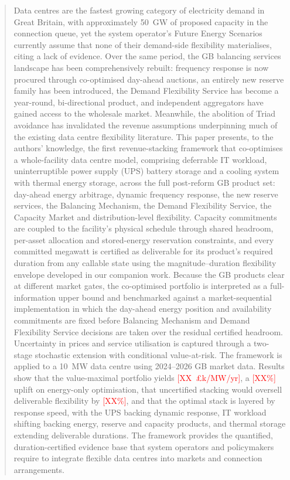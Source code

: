 \documentclass[lettersize,journal]{IEEEtran}
\newcommand{\tbd}[1]{\textcolor{red}{[#1]}}
\begin{document}
\begin{abstract}
Data centres are the fastest growing category of electricity demand in Great Britain, with approximately 50~GW of proposed capacity in the connection queue, yet the system operator's Future Energy Scenarios currently assume that none of their demand-side flexibility materialises, citing a lack of evidence. Over the same period, the GB balancing services landscape has been comprehensively rebuilt: frequency response is now procured through co-optimised day-ahead auctions, an entirely new reserve family has been introduced, the Demand Flexibility Service has become a year-round, bi-directional product, and independent aggregators have gained access to the wholesale market. Meanwhile, the abolition of Triad avoidance has invalidated the revenue assumptions underpinning much of the existing data centre flexibility literature. This paper presents, to the authors' knowledge, the first revenue-stacking framework that co-optimises a whole-facility data centre model, comprising deferrable IT workload, uninterruptible power supply (UPS) battery storage and a cooling system with thermal energy storage, across the full post-reform GB product set: day-ahead energy arbitrage, dynamic frequency response, the new reserve services, the Balancing Mechanism, the Demand Flexibility Service, the Capacity Market and distribution-level flexibility. Capacity commitments are coupled to the facility's physical schedule through shared headroom, per-asset allocation and stored-energy reservation constraints, and every committed megawatt is certified as deliverable for its product's required duration from any callable state using the magnitude--duration flexibility envelope developed in our companion work. Because the GB products clear at different market gates, the co-optimised portfolio is interpreted as a full-information upper bound and benchmarked against a market-sequential implementation in which the day-ahead energy position and availability commitments are fixed before Balancing Mechanism and Demand Flexibility Service decisions are taken over the residual certified headroom. Uncertainty in prices and service utilisation is captured through a two-stage stochastic extension with conditional value-at-risk. The framework is applied to a 10~MW data centre using 2024--2026 GB market data. Results show that the value-maximal portfolio yields \tbd{XX~\pounds k/MW/yr}, a \tbd{XX\%} uplift on energy-only optimisation, that uncertified stacking would oversell deliverable flexibility by \tbd{XX\%}, and that the optimal stack is layered by response speed, with the UPS backing dynamic response, IT workload shifting backing energy, reserve and capacity products, and thermal storage extending deliverable durations. The framework provides the quantified, duration-certified evidence base that system operators and policymakers require to integrate flexible data centres into markets and connection arrangements.
\end{abstract}
\end{document}
